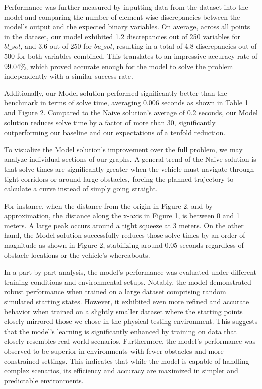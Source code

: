 \documentclass[
	letterpaper, %
	10pt, %
	unnumberedsections, %
	twoside, %
]{LTJournalArticle}
\begin{document}
\quad Performance was further measured by inputting data from the dataset into the model and comparing the number of element-wise discrepancies between the model’s output and the expected binary variables. On average, across all points in the dataset, our model exhibited 1.2 discrepancies out of 250 variables for $bl\_sol$, and 3.6 out of 250 for $bu\_sol$, resulting in a total of 4.8 discrepancies out of 500 for both variables combined. This translates to an impressive accuracy rate of 99.04\%, which proved accurate enough for the model to solve the problem independently with a similar success rate.

Additionally, our Model solution performed significantly better than the benchmark in terms of solve time, averaging 0.006 seconds as shown in Table 1 and Figure 2. Compared to the Naive solution's average of 0.2 seconds, our Model solution reduces solve time by a factor of more than 30, significantly outperforming our baseline and our expectations of a tenfold reduction.

To visualize the Model solution’s improvement over the full problem, we may analyze individual sections of our graphs. A general trend of the Naive solution is that solve times are significantly greater when the vehicle must navigate through tight corridors or around large obstacles, forcing the planned trajectory to calculate a curve instead of simply going straight.

For instance, when the distance from the origin in Figure 2, and by approximation, the distance along the x-axis in Figure 1, is between 0 and 1 meters. A large peak occurs around a tight squeeze at 3 meters. On the other hand, the Model solution successfully reduces those solve times by an order of magnitude as shown in Figure 2, stabilizing around 0.05 seconds regardless of obstacle locations or the vehicle's whereabouts.

In a part-by-part analysis, the model's performance was evaluated under different training conditions and environmental setups. Notably, the model demonstrated robust performance when trained on a large dataset comprising random simulated starting states. However, it exhibited even more refined and accurate behavior when trained on a slightly smaller dataset where the starting points closely mirrored those we chose in the physical testing environment. This suggests that the model's learning is significantly enhanced by training on data that closely resembles real-world scenarios. Furthermore, the model's performance was observed to be superior in environments with fewer obstacles and more constrained settings. This indicates that while the model is capable of handling complex scenarios, its efficiency and accuracy are maximized in simpler and predictable environments.
\end{document}
